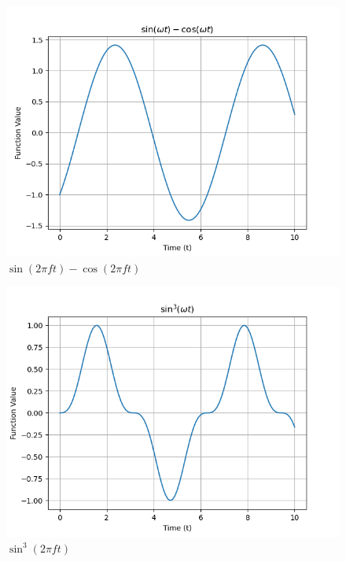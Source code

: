 \documentclass[journal,12pt,onecolumn]{IEEEtran}
\theoremstyle{remark}
\begin{document}
 
 \begin{figure}[h!]
    \centering
    \includegraphics[width=\columnwidth]{figs/a1_fig1.png}
    \caption{$\sin(2\pi f t)- \cos(2\pi f t)$}
    \label{fig:11.14.4.1}
\end{figure}
 \begin{figure}[h!]
    \centering
    \includegraphics[width=\columnwidth]{figs/a1_fig2.png}
    \caption{$\sin^3(2\pi f t)$}
    \label{fig:11.14.4.2}
\end{figure}
\newpage
\end{document}
